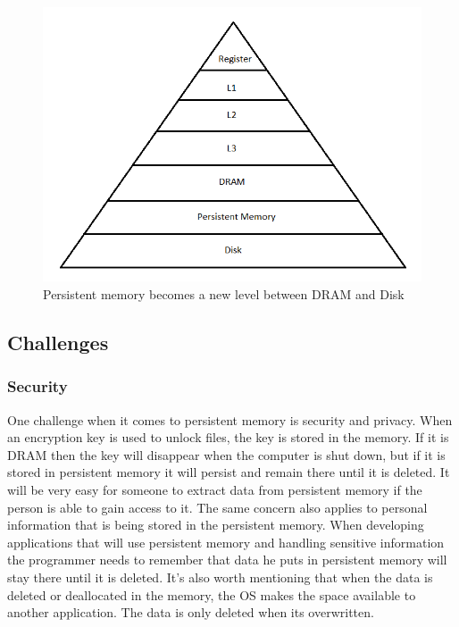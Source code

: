 \documentclass[12pt,a4paper,USenglish]{article}      %
\begin{document}
\begin{figure}[!hbtp]
\includegraphics[scale=0.85]{Intro/Pyramid.png}
\caption{Persistent memory becomes a new level between DRAM and Disk\cite{optane}}
\label{fig:Pyramid}
\end{figure}

\subsection{Challenges}

\subsubsection{Security}
One challenge when it comes to persistent memory is security and privacy\cite{Badam}. When an encryption key is used to unlock files, the key is stored in the memory. If it is DRAM then the key will disappear when the computer is shut down, but if it is stored in persistent memory it will persist and remain there until it is deleted. It will be very easy for someone to extract data from persistent memory if the person is able to gain access to it. The same concern also applies to personal information that is being stored in the persistent memory. When developing applications that will use persistent memory and handling sensitive information the programmer needs to remember that data he puts in persistent memory will stay there until it is deleted. It’s also worth mentioning that when the data is deleted or deallocated in the memory, the OS makes the space available to another application. The data is only deleted when its overwritten.
\end{document}
